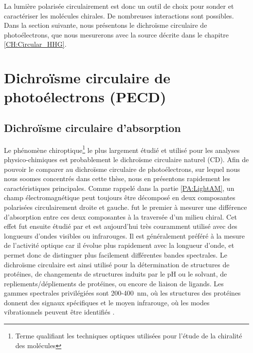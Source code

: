 La lumière polarisée circulairement est donc un outil de choix pour sonder et caractériser les molécules chirales. De nombreuses interactions sont possibles. Dans la section suivante, nous présentons le dichroïsme circulaire de photoélectrons, que nous mesurerons avec la source décrite dans le chapitre \ref{CH:Circular_HHG}.


\section{Dichroïsme circulaire de photoélectrons (PECD)}
\label{sec:PECD}
\subsection{Dichroïsme circulaire d'absorption}
Le phénomène chiroptique\footnote{Terme qualifiant les techniques optiques utilisées pour l'étude de la chiralité des molécules} le plus largement étudié et utilisé pour les analyses physico-chimiques est probablement le dichroïsme circulaire naturel (CD). Afin de pouvoir le comparer au dichroïsme circulaire de photoélectrons, sur lequel nous nous soomes concentrés dans cette thèse, nous en présentons rapidement les caractéristiques principales. Comme rappelé dans la partie \ref{PA:LightAM}, un champ électromagnétique peut toujours être décomposé en deux composantes polarisées circulairement droite et gauche.  fut le premier à mesurer une différence d'absorption entre ces deux composantes à la traversée d'un milieu chiral. Cet effet fut ensuite étudié par  et est aujourd'hui très couramment utilisé avec des longueurs d'ondes visibles ou infrarouges. Il est généralement préféré à la mesure de l'activité optique car il évolue plus rapidement avec la longueur d'onde, et permet donc de distinguer plus facilement différentes bandes spectrales. Le dichroïsme circulaire est ainsi utilisé pour la détermination de structures de protéines, de changements de structures induits par le pH ou le solvant, de repliements/dépliements de protéines, ou encore de liaison de ligands. Les gammes spectrales privilégiées sont 200-400~nm, où les structures des protéines donnent des signaux spécifiques  et le moyen infrarouge, où les modes vibrationnels peuvent être identifiés .

